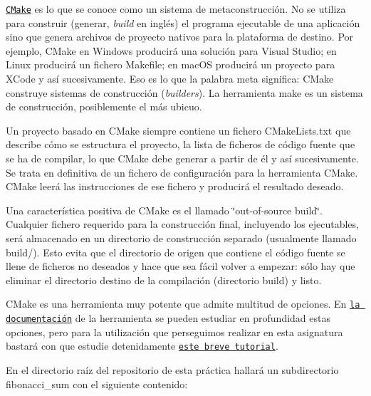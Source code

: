 \href{https://es.wikipedia.org/wiki/CMake}{\tt C\+Make} es lo que se conoce como un sistema de metaconstrucción. No se utiliza para construir (generar, {\itshape build} en inglés) el programa ejecutable de una aplicación sino que genera archivos de proyecto nativos para la plataforma de destino. Por ejemplo, C\+Make en Windows producirá una solución para Visual Studio; en Linux producirá un fichero Makefile; en mac\+OS producirá un proyecto para X\+Code y así sucesivamente. Eso es lo que la palabra meta significa\+: C\+Make construye sistemas de construcción ({\itshape builders}). La herramienta make es un sistema de construcción, posiblemente el más ubicuo.

Un proyecto basado en C\+Make siempre contiene un fichero {\ttfamily C\+Make\+Lists.\+txt} que describe cómo se estructura el proyecto, la lista de ficheros de código fuente que se ha de compilar, lo que C\+Make debe generar a partir de él y así sucesivamente. Se trata en definitiva de un fichero de configuración para la herramienta C\+Make. C\+Make leerá las instrucciones de ese fichero y producirá el resultado deseado.

Una característica positiva de C\+Make es el llamado \char`\"{}out-\/of-\/source build\char`\"{}. Cualquier fichero requerido para la construcción final, incluyendo los ejecutables, será almacenado en un directorio de construcción separado (usualmente llamado build/). Esto evita que el directorio de origen que contiene el código fuente se llene de ficheros no deseados y hace que sea fácil volver a empezar\+: sólo hay que eliminar el directorio destino de la compilación (directorio build) y listo.

C\+Make es una herramienta muy potente que admite multitud de opciones. En \href{https://cmake.org/cmake/help/latest/index.html}{\tt la documentación} de la herramienta se pueden estudiar en profundidad estas opciones, pero para la utilización que perseguimos realizar en esta asignatura bastará con que estudie detenidamente \href{https://www.internalpointers.com/post/modern-cmake-beginner-introduction}{\tt este breve tutorial}.

En el directorio raíz del repositorio de esta práctica hallará un subdirectorio {\ttfamily fibonacci\+\_\+sum} con el siguiente contenido\+:


